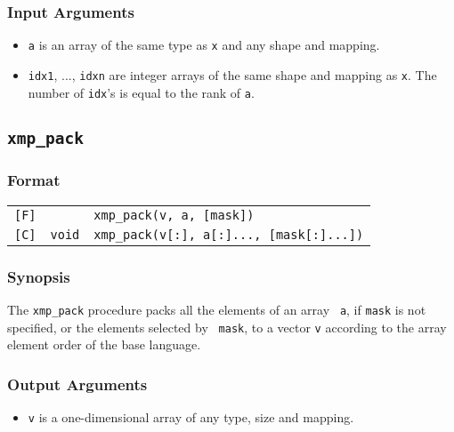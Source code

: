 \subsubsection*{Input Arguments}
\begin{itemize}
 \item {\tt a} is an array of the same type as {\tt x} and any shape
       and mapping.
 \item {\tt idx1}, ..., {\tt idxn} are integer arrays of the same
       shape and mapping as {\tt x}. The number of {\tt idx}'s is
       equal to the rank of {\tt a}.
\end{itemize}


\subsection{\tt xmp\_pack}
\label{155236_16Jan17}

\subsubsection*{Format}

\begin{tabular}{lll}

\verb![F]!&            & {\tt xmp\_pack(v, a, [mask])}\\

\verb![C]!& {\tt void} & {\tt xmp\_pack(v[:], a[:]..., [mask[:]...])}\\

\end{tabular}

\subsubsection*{Synopsis}

The {\tt xmp\_pack} procedure packs all the elements of an array {\tt
a}, if {\tt mask} is not specified, or the elements selected by {\tt
mask}, to a vector {\tt v} according to the array element order of the
base language.

\subsubsection*{Output Arguments}
\begin{itemize}
 \item {\tt v} is a one-dimensional array of any type, size and
       mapping.
\end{itemize}

